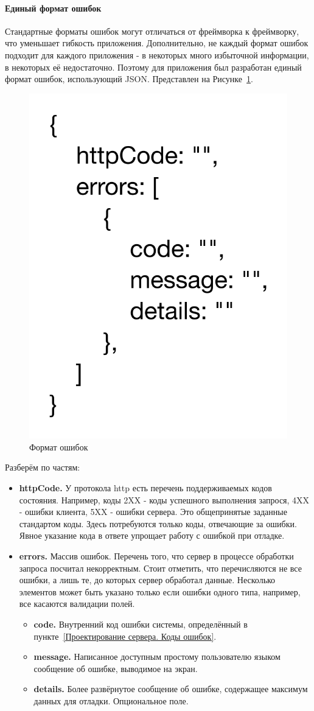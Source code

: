 \documentclass[a4paper,article]{article}
\begin{document}
    \paragraph{Единый формат ошибок}

    Стандартные форматы ошибок могут отличаться от фреймворка к фреймворку, что уменьшает гибкость приложения. Дополнительно, не каждый формат ошибок подходит для каждого приложения - в некоторых много избыточной информации, в некоторых её недостаточно. Поэтому для приложения был разработан единый формат ошибок, использующий JSON. Представлен на Рисунке~\ref{fig:Формат ошибок}.

    \begin{figure}[h]

        \centering

        \includegraphics[width=0.3\linewidth]{Формат ошибок.png}

        \caption{\centering Формат ошибок}

        \label{fig:Формат ошибок}

    \end{figure}

    Разберём по частям:

    \begin{itemize}[nolistsep]
        \item \textbf{httpCode.} У протокола http есть перечень поддерживаемых кодов состояния. Например, коды 2XX - коды успешного выполнения запрося, 4XX - ошибки клиента, 5XX - ошибки сервера. Это общепринятые заданные стандартом коды. Здесь потребуются только коды, отвечающие за ошибки. Явное указание кода в ответе упрощает работу с ошибкой при отладке.
        \item \textbf{errors.} Массив ошибок. Перечень того, что сервер в процессе обработки запроса посчитал некорректным. Стоит отметить, что перечисляются не все ошибки, а лишь те, до которых сервер обработал данные. Несколько элементов может быть указано только если ошибки одного типа, например, все касаются валидации полей.
        \begin{itemize}[nolistsep]
            \item \textbf{code.} Внутренний код ошибки системы, определённый в пункте~\ref{Проектирование сервера. Коды ошибок}.
            \item \textbf{message.} Написанное доступным простому пользователю языком сообщение об ошибке, выводимое на экран.
            \item \textbf{details.} Более развёрнутое сообщение об ошибке, содержащее максимум данных для отладки. Опциональное поле.
        \end{itemize}
    \end{itemize}
\end{document}
